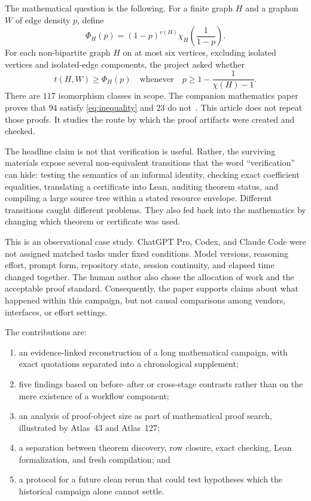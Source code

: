 \documentclass[11pt]{article}
\begin{document}
The mathematical question is the following.  For a finite graph $H$ and a
graphon $W$ of edge density $p$, define
\begin{equation}
 \Phi_H(p)=(1-p)^{v(H)}\chi_H\!\left(\frac{1}{1-p}\right).
 \label{eq:target}
\end{equation}
For each non-bipartite graph $H$ on at most six vertices, excluding isolated
vertices and isolated-edge components, the project asked whether
\begin{equation}
 t(H,W)\geq \Phi_H(p)
 \quad\text{whenever}\quad
 p\geq 1-\frac{1}{\chi(H)-1}.
 \label{eq:inequality}
\end{equation}
There are $117$ isomorphism classes in scope.  The companion mathematics
paper proves that $94$ satisfy \eqref{eq:inequality} and $23$ do
not~\cite{CompanionMath2026}.  This article does not repeat those proofs.  It
studies the route by which the proof artifacts were created and checked.

The headline claim is not that verification is useful.  Rather, the surviving
materials expose several non-equivalent transitions that the word
``verification'' can hide: testing the semantics of an informal identity,
checking exact coefficient equalities, translating a certificate into Lean,
auditing theorem status, and compiling a large source tree within a stated
resource envelope.  Different transitions caught different problems.  They
also fed back into the mathematics by changing which theorem or certificate
was used.

This is an observational case study.  ChatGPT Pro, Codex, and Claude Code were
not assigned matched tasks under fixed conditions.  Model versions, reasoning
effort, prompt form, repository state, session continuity, and elapsed time
changed together.  The human author also chose the allocation of work and
the acceptable proof standard.  Consequently, the paper supports claims
about what happened within this campaign, but not causal comparisons among
vendors, interfaces, or effort settings.

The contributions are:
\begin{enumerate}[leftmargin=2em]
 \item an evidence-linked reconstruction of a long mathematical campaign,
 with exact quotations separated into a chronological supplement;
 \item five findings based on before--after or cross-stage contrasts rather
 than on the mere existence of a workflow component;
 \item an analysis of proof-object size as part of mathematical proof search,
 illustrated by Atlas~43 and Atlas~127;
 \item a separation between theorem discovery, row closure, exact checking,
 Lean formalization, and fresh compilation; and
 \item a protocol for a future clean rerun that could test hypotheses which
 the historical campaign alone cannot settle.
\end{enumerate}
\end{document}
